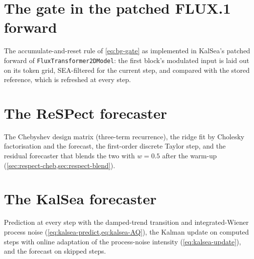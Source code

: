


\section{The gate in the patched FLUX.1 forward}\label{sec:app-gate}
The accumulate-and-reset rule of \cref{eq:bg-gate} as implemented in KalSea's patched forward of \texttt{Flux\-Transformer\-2D\-Model}: the first block's modulated input is laid out on its token grid, SEA-filtered for the current step, and compared with the stored reference, which is refreshed at every step.



\section{The ReSPect forecaster}\label{sec:app-respect}
The Chebyshev design matrix (three-term recurrence), the ridge fit by Cholesky factorisation and the forecast, the first-order discrete Taylor step, and the residual forecaster that blends the two with $w=0.5$ after the warm-up (\cref{sec:respect-cheb,sec:respect-blend}).






\section{The KalSea forecaster}\label{sec:app-kalsea}
Prediction at every step with the damped-trend transition and integrated-Wiener process noise (\cref{eq:kalsea-predict,eq:kalsea-AQ}), the Kalman update on computed steps with online adaptation of the process-noise intensity (\cref{eq:kalsea-update}), and the forecast on skipped steps.

